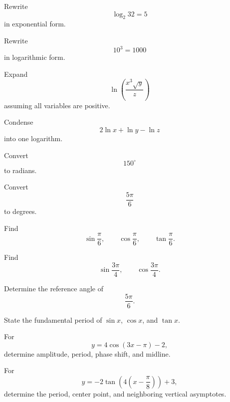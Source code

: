 \begin{exercise}[1]
Rewrite
\[ \log_2 32=5 \]
in exponential form.
\end{exercise}

\begin{exercise}[1]
Rewrite
\[ 10^3=1000 \]
in logarithmic form.
\end{exercise}

\begin{exercise}[2]
Expand
\[ \ln\left(\frac{x^3\sqrt y}{z}\right) \]
assuming all variables are positive.
\end{exercise}

\begin{exercise}[2]
Condense
\[ 2\ln x+\ln y-\ln z \]
into one logarithm.
\end{exercise}

\begin{exercise}[1]
Convert
\[ 150^\circ \]
to radians.
\end{exercise}

\begin{exercise}[1]
Convert
\[ \frac{5\pi}{6} \]
to degrees.
\end{exercise}

\begin{exercise}[1]
Find
\[ \sin\frac{\pi}{6},\qquad
\cos\frac{\pi}{6},\qquad
\tan\frac{\pi}{6}. \]
\end{exercise}

\begin{exercise}[1]
Find
\[ \sin\frac{3\pi}{4},\qquad
\cos\frac{3\pi}{4}. \]
\end{exercise}

\begin{exercise}[2]
Determine the reference angle of
\[ \frac{5\pi}{6}. \]
\end{exercise}

\begin{exercise}[1]
State the fundamental period of \(\sin x\), \(\cos x\), and \(\tan x\).
\end{exercise}

\begin{exercise}[2]
For
\[ y=4\cos(3x-\pi)-2, \]
determine amplitude, period, phase shift, and midline.
\end{exercise}

\begin{exercise}[2]
For
\[ y=-2\tan\left(4\left(x-\frac{\pi}{8}\right)\right)+3, \]
determine the period, center point, and neighboring vertical asymptotes.
\end{exercise}

